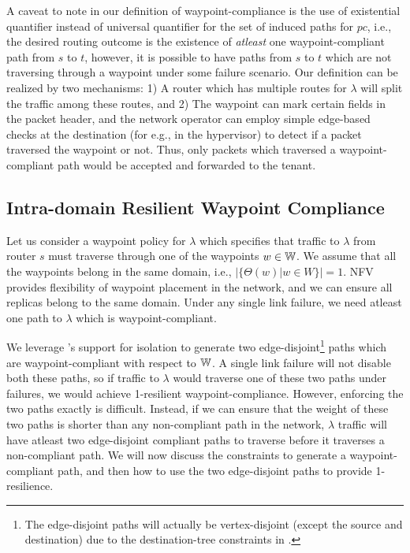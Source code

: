 A caveat to note in our definition of waypoint-compliance 
is the use of existential quantifier instead of universal 
quantifier for the set of induced paths for $pc$, i.e.,
the desired routing outcome is the existence of \emph{atleast}
one waypoint-compliant path from $s$ to $t$, 
however, it is possible to
have paths from $s$ to $t$ which are not traversing through 
a waypoint under some failure scenario. Our 
definition can be realized by two mechanisms: 1) A router
which has multiple routes for $\lambda$ will split the traffic
among these routes, and 2) The waypoint can mark certain fields in
the packet header, and the network operator can employ 
simple edge-based checks at the destination 
(for e.g., in the hypervisor) to 
detect if a packet traversed the waypoint or not. Thus, only
packets which traversed a waypoint-compliant path would be 
accepted and forwarded to the tenant. 

\subsection{Intra-domain Resilient Waypoint Compliance}\label{sec:ospfwaypoint}
Let us consider a waypoint policy for $\lambda$ which
specifies that traffic to $\lambda$ from router $s$ 
must traverse through
one of the waypoints $w \in \mathbb{W}$. We assume that 
all the waypoints belong in the same domain, i.e., 
$|\{\Theta(w) | w \in W\}| = 1$. NFV provides 
flexibility of waypoint placement in the network, 
and we can ensure
all replicas belong to the same domain.  
Under any single link failure, we need atleast one path 
to $\lambda$ which is waypoint-compliant. 

We leverage \genesis's
support for isolation to generate two edge-disjoint\footnote
{The edge-disjoint paths will actually be vertex-disjoint (except the 
	source and destination) due to the destination-tree constraints
	in \genesis.} paths
which are waypoint-compliant with respect to $\mathbb{W}$. A single link
failure will not disable both these paths, so if traffic to $\lambda$ 
would 
traverse one of these two paths under failures, 
we would achieve 1-resilient
waypoint-compliance. However, enforcing the two paths exactly
is difficult. Instead, if we can ensure that the weight
of these two paths is shorter than any non-compliant path in 
the network, $\lambda$ traffic will have atleast two edge-disjoint 
compliant paths to traverse 
before it traverses a non-compliant path. We will now discuss the
constraints to generate a waypoint-compliant path, and then 
how to use the two edge-disjoint paths to provide 1-resilience. 


